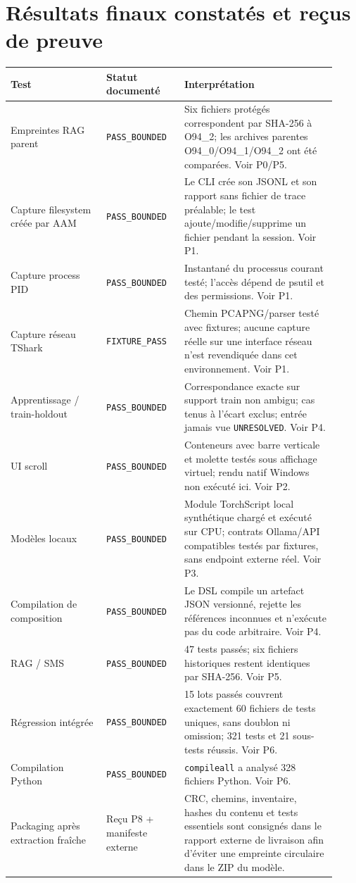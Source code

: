 \documentclass[11pt,a4paper]{article}
\begin{document}
\section{Résultats finaux constatés et reçus de preuve}
\begin{longtable}{p{0.27\linewidth}p{0.22\linewidth}p{0.43\linewidth}}
\toprule Test & Statut documenté & Interprétation \tabularnewline
\midrule
Empreintes RAG parent & \texttt{PASS\_BOUNDED} & Six fichiers protégés correspondent par SHA-256 à O94\_2; les archives parentes O94\_0/O94\_1/O94\_2 ont été comparées. Voir P0/P5. \tabularnewline
Capture filesystem créée par AAM & \texttt{PASS\_BOUNDED} & Le CLI crée son JSONL et son rapport sans fichier de trace préalable; le test ajoute/modifie/supprime un fichier pendant la session. Voir P1. \tabularnewline
Capture process PID & \texttt{PASS\_BOUNDED} & Instantané du processus courant testé; l’accès dépend de psutil et des permissions. Voir P1. \tabularnewline
Capture réseau TShark & \texttt{FIXTURE\_PASS} & Chemin PCAPNG/parser testé avec fixtures; aucune capture réelle sur une interface réseau n’est revendiquée dans cet environnement. Voir P1. \tabularnewline
Apprentissage / train-holdout & \texttt{PASS\_BOUNDED} & Correspondance exacte sur support train non ambigu; cas tenus à l’écart exclus; entrée jamais vue \texttt{UNRESOLVED}. Voir P4. \tabularnewline
UI scroll & \texttt{PASS\_BOUNDED} & Conteneurs avec barre verticale et molette testés sous affichage virtuel; rendu natif Windows non exécuté ici. Voir P2. \tabularnewline
Modèles locaux & \texttt{PASS\_BOUNDED} & Module TorchScript local synthétique chargé et exécuté sur CPU; contrats Ollama/API compatibles testés par fixtures, sans endpoint externe réel. Voir P3. \tabularnewline
Compilation de composition & \texttt{PASS\_BOUNDED} & Le DSL compile un artefact JSON versionné, rejette les références inconnues et n'exécute pas du code arbitraire. Voir P4. \tabularnewline
RAG / SMS & \texttt{PASS\_BOUNDED} & 47 tests passés; six fichiers historiques restent identiques par SHA-256. Voir P5. \tabularnewline
Régression intégrée & \texttt{PASS\_BOUNDED} & 15 lots passés couvrent exactement 60 fichiers de tests uniques, sans doublon ni omission; 321 tests et 21 sous-tests réussis. Voir P6. \tabularnewline
Compilation Python & \texttt{PASS\_BOUNDED} & \texttt{compileall} a analysé 328 fichiers Python. Voir P6. \tabularnewline
Packaging après extraction fraîche & Reçu P8 + manifeste externe & CRC, chemins, inventaire, hashes du contenu et tests essentiels sont consignés dans le rapport externe de livraison afin d’éviter une empreinte circulaire dans le ZIP du modèle. \tabularnewline
\bottomrule
\end{longtable}
\end{document}
